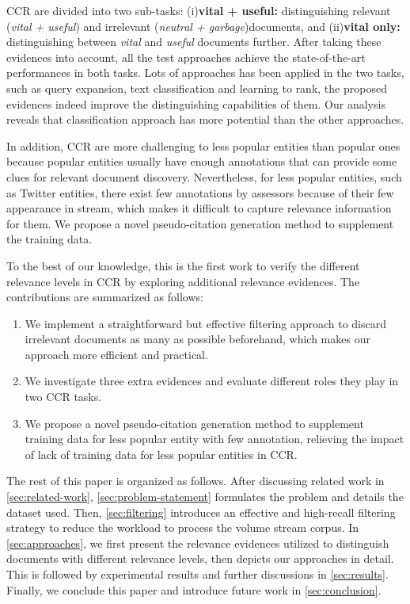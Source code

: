 \documentclass{sig-alternate}
\begin{document}
CCR are divided into two sub-tasks: (i)\textbf{vital + useful:} distinguishing relevant (\textit{vital + useful}) and irrelevant (\textit{neutral + garbage})documents, and (ii)\textbf{vital only:} distinguishing between \textit{vital} and \textit{useful} documents further. After taking these evidences into account, all the test approaches achieve the state-of-the-art performances in both tasks. Lots of approaches has been applied in the two tasks, such as query expansion, text classification and learning to rank, the proposed evidences indeed improve the distinguishing capabilities of them. Our analysis reveals that classification approach has more potential than the other approaches.

In addition, CCR are more challenging to less popular entities than popular ones because popular entities usually have enough annotations that can provide some clues for relevant document discovery. Nevertheless, for less popular entities, such as Twitter entities, there exist few annotations by assessors because of their few appearance in stream, which makes it difficult to capture relevance information for them. We propose a novel pseudo-citation generation method to supplement the training data.

To the best of our knowledge, this is the first work to verify the different relevance levels in CCR by exploring additional relevance evidences. The contributions are summarized as follows: 
\begin{enumerate}
\item We implement a straightforward but effective filtering approach to discard irrelevant documents as many as possible beforehand, which makes our approach more efficient and practical.
\item We investigate three extra evidences and evaluate different roles they play in two CCR tasks. 
\item We propose a novel pseudo-citation generation method to supplement training data for less popular entity with few annotation, relieving the impact of lack of training data for less popular entities in CCR.
\end{enumerate}

The rest of this paper is organized as follows. After discussing related work in \autoref{sec:related-work}, \autoref{sec:problem-statement} formulates the problem and details the dataset used. Then, \autoref{sec:filtering} introduces an effective and high-recall filtering strategy to reduce the workload to process the volume stream corpus. In \autoref{sec:approaches}, we first present the relevance evidences utilized to distinguish documents with different relevance levels, then depicts our approaches in detail. This is followed by experimental results and further discussions in \autoref{sec:results}. Finally, we conclude this paper and introduce future work in \autoref{sec:conclusion}.
\end{document}
